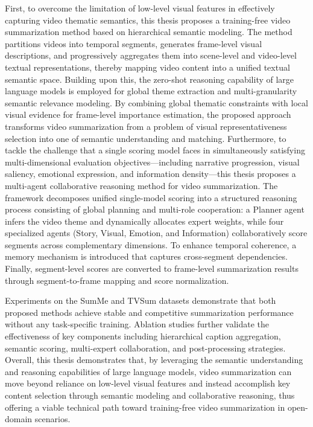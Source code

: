 \begin{englishabstract}
First, to overcome the limitation of low-level visual features in effectively capturing video thematic semantics, this thesis proposes a training-free video summarization method based on hierarchical semantic modeling. The method partitions videos into temporal segments, generates frame-level visual descriptions, and progressively aggregates them into scene-level and video-level textual representations, thereby mapping video content into a unified textual semantic space. Building upon this, the zero-shot reasoning capability of large language models is employed for global theme extraction and multi-granularity semantic relevance modeling. By combining global thematic constraints with local visual evidence for frame-level importance estimation, the proposed approach transforms video summarization from a problem of visual representativeness selection into one of semantic understanding and matching. Furthermore, to tackle the challenge that a single scoring model faces in simultaneously satisfying multi-dimensional evaluation objectives---including narrative progression, visual saliency, emotional expression, and information density---this thesis proposes a multi-agent collaborative reasoning method for video summarization. The framework decomposes unified single-model scoring into a structured reasoning process consisting of global planning and multi-role cooperation: a Planner agent infers the video theme and dynamically allocates expert weights, while four specialized agents (Story, Visual, Emotion, and Information) collaboratively score segments across complementary dimensions. To enhance temporal coherence, a memory mechanism is introduced that captures cross-segment dependencies. Finally, segment-level scores are converted to frame-level summarization results through segment-to-frame mapping and score normalization.

Experiments on the SumMe and TVSum datasets demonstrate that both proposed methods achieve stable and competitive summarization performance without any task-specific training. Ablation studies further validate the effectiveness of key components including hierarchical caption aggregation, semantic scoring, multi-expert collaboration, and post-processing strategies. Overall, this thesis demonstrates that, by leveraging the semantic understanding and reasoning capabilities of large language models, video summarization can move beyond reliance on low-level visual features and instead accomplish key content selection through semantic modeling and collaborative reasoning, thus offering a viable technical path toward training-free video summarization in open-domain scenarios.


\end{englishabstract}